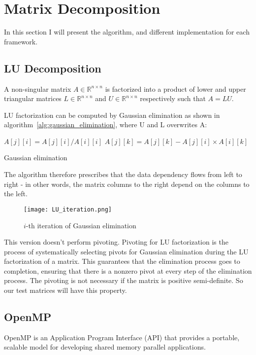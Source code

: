 \chapter{Matrix Decomposition}
\label{matrix_decomposition}
In this section I will present the algorithm, and different implementation for each framework.
\section{LU Decomposition}
A non-singular matrix $A \in \mathbb{R}^{n \times n}$ is factorized into a product of lower and upper triangular matrices $L \in \mathbb{R}^{n \times n}$ and $U \in \mathbb{R}^{n \times n}$ respectively such that $A = LU$.

LU factorization can be computed by Gaussian elimination as
shown in algorithm~\ref{alg:gaussian_elimination}, where U and L overwrites A:

\begin{algorithm}
\begin{algorithmic}
		\State $A[j][i] = A[j][i] / A[i][i]$ 
	\EndFor
			\State $A[j][k] = A[j][k] - A[j][i] \times A[i][k]$ 
		\EndFor	
	\EndFor
\EndFor
\end{algorithmic}
\caption{Gaussian elimination}
\label{alg:gaussian_elimination}
\end{algorithm}

The algorithm therefore prescribes that the data dependency flows from left to right - in other words, the matrix columns to the right depend on the columns to the left. 

\begin{figure}[H]
\centering
\texttt{[image: LU\_iteration.png]}
\caption{$i$-th iteration of Gaussian elimination}
\end{figure}


This version doesn't perform pivoting. Pivoting for LU factorization is the process of systematically selecting pivots for Gaussian elimination
during the LU factorization of a matrix. This guarantees that the elimination process goes to completion, ensuring that there is a nonzero pivot at every step of the elimination process. The pivoting is not necessary if the matrix is positive semi-definite. So our test matrices will have this property.


\section{OpenMP}
OpenMP is an Application Program Interface (API) that provides a portable, scalable model for developing shared memory parallel applications.


